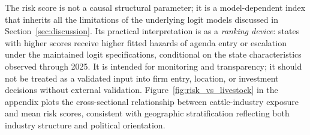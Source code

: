 \documentclass[12pt]{article}
\begin{document}
\begin{appendices}
The risk score is not a causal structural parameter; it is a model-dependent index that inherits all the limitations of the underlying logit models discussed in Section~\ref{sec:discussion}.  Its practical interpretation is as a \emph{ranking device}: states with higher scores receive higher fitted hazards of agenda entry or escalation under the maintained logit specifications, conditional on the state characteristics observed through 2025.  It is intended for monitoring and transparency; it should not be treated as a validated input into firm entry, location, or investment decisions without external validation.  Figure~\ref{fig:risk_vs_livestock} in the appendix plots the cross-sectional relationship between cattle-industry exposure and mean risk scores, consistent with geographic stratification reflecting both industry structure and political orientation.

\end{appendices}
\end{document}
